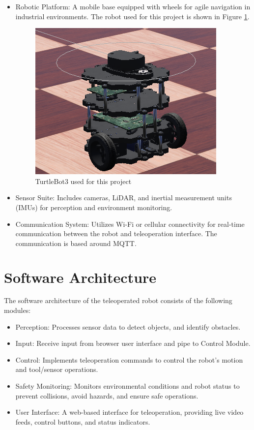\documentclass{article}
\begin{document}
\begin{itemize}
    \item Robotic Platform: A mobile base equipped with wheels for agile navigation in industrial environments. The robot used for this project is shown in Figure \ref{fig:turtlebot}.

        \begin{figure}[h]
        \centering
        \includegraphics[width=0.5\linewidth]{Design Document/TurtleBot3.png}
        \caption{TurtleBot3 used for this project}
        \label{fig:turtlebot}
    \end{figure}
    
    \item Sensor Suite: Includes cameras, LiDAR, and inertial measurement units (IMUs) for perception and environment monitoring.
    
    \item Communication System: Utilizes Wi-Fi or cellular connectivity for real-time communication between the robot and teleoperation interface. The communication is based around MQTT.
\end{itemize}

\section{Software Architecture}

The software architecture of the teleoperated robot consists of the following modules:

\begin{itemize}
    \item Perception: Processes sensor data to detect objects, and identify obstacles.
    \item Input: Receive input from browser user interface and pipe to Control Module.
    \item Control: Implements teleoperation commands to control the robot's motion and tool/sensor operations.
    \item Safety Monitoring: Monitors environmental conditions and robot status to prevent collisions, avoid hazards, and ensure safe operations.
    \item User Interface: A web-based interface for teleoperation, providing live video feeds, control buttons, and status indicators.
\end{itemize}
\end{document}
